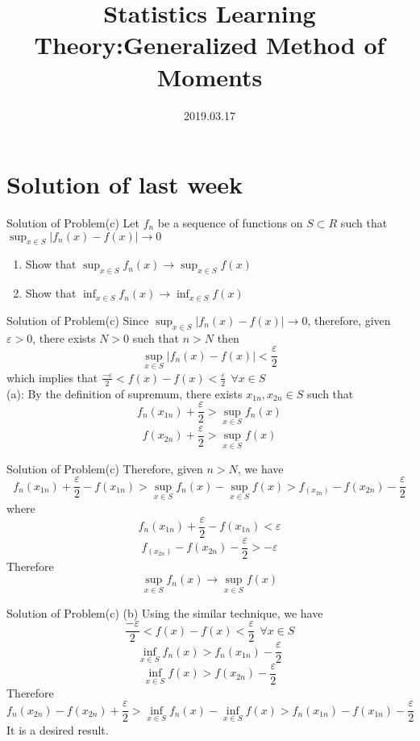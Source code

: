 \documentclass{beamer}
\title[Introduction]{Statistics Learning Theory:Generalized Method of Moments}
\author{}
\institute{}
\date{2019.03.17}
\begin{document}
\begin{frame}
  \titlepage
\end{frame}

\section{Solution of last week}
\begin{frame}{Solution of Problem(c)}
	Let $f_n$ be a sequence of functions on $S \subset R$ such that $\sup_{x \in S} |f_n(x) - f(x)| \rightarrow 0$
	\begin{enumerate}
		\item Show that $\sup_{x \in S} f_n(x) \rightarrow \sup_{x \in S} f(x)$
		\item Show that $\inf_{x \in S} f_n(x) \rightarrow \inf_{x \in S} f(x)$
	\end{enumerate}
\end{frame}
\begin{frame}{Solution of Problem(c)}
	Since $\sup_{x \in S} |f_n(x) - f(x)| \rightarrow 0$, therefore, given $\varepsilon >0$, there exists $N>0$ such that $n > N$ then
	\[\sup_{x \in S} |f_n(x) - f(x)| < \frac{\varepsilon}{2}\]
	which implies that $\frac{-\varepsilon}{2}< f(x) - f(x) < \frac{\varepsilon}{2} \ \ \forall x \in S$\\
	(a): By the definition of supremum, there exists $x_{1n},x_{2n} \in S$ such that
	\[f_n(x_{1n}) + \frac{\varepsilon}{2} > \sup_{x \in S} f_n(x)\]
	\[f(x_{2n}) + \frac{\varepsilon}{2} > \sup_{x \in S} f(x)\]
\end{frame}
\begin{frame}{Solution of Problem(c)}
	Therefore, given $n>N$, we have
	\[ f_n(x_{1n}) + \frac{\varepsilon}{2} - f(x_{1n})> \sup_{x \in S} f_n(x) - \sup_{x \in S} f(x) > f_(x_{2n}) - f(x_{2n}) - \frac{\varepsilon}{2}\]
	where
	\[f_n(x_{1n}) + \frac{\varepsilon}{2} - f(x_{1n}) < \varepsilon\]
	\[f_(x_{2n}) - f(x_{2n}) - \frac{\varepsilon}{2} > - \varepsilon\]
	Therefore
	\[\sup_{x \in S} f_n(x) \rightarrow \sup_{x \in S} f(x)\]
\end{frame}
\begin{frame}{Solution of Problem(c)}     
	(b) Using the similar technique, we have 
	\[\frac{-\varepsilon}{2}< f(x) - f(x) < \frac{\varepsilon}{2} \ \ \forall x \in S\]
	\[\inf_{x \in S} f_n(x) > f_n(x_{1n}) - \frac{\varepsilon}{2}\]
	\[\inf_{x \in S} f(x) > f(x_{2n}) - \frac{\varepsilon}{2}\]
	Therefore
	\[f_n(x_{2n}) - f(x_{2n}) + \frac{\varepsilon}{2} > \inf_{x \in S} f_n(x) - \inf_{x \in S} f(x) > f_n(x_{1n}) - f(x_{1n}) - \frac{\varepsilon}{2}\]
	It is a desired result.
\end{frame}
\end{document}
